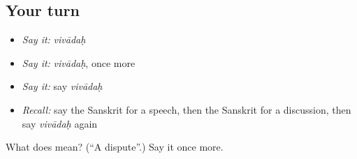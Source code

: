 \subsection*{Your turn}
\begin{itemize}
\raggedright
  \item \emph{Say it:} \emph{vivādaḥ}
  \item \emph{Say it:} \emph{vivādaḥ}, once more
  \item \emph{Say it:} say \emph{vivādaḥ}
  \item \emph{Recall:} say the Sanskrit for a speech, then the Sanskrit for a discussion, then say \emph{vivādaḥ} again
\end{itemize}

\begin{tcolorbox}[breakable,colback=teal!4,colframe=teal!35!black,title={Before you move on}]
What does  mean? (\textquotedblleft{}A dispute\textquotedblright{}.) Say it once more.
\end{tcolorbox}

